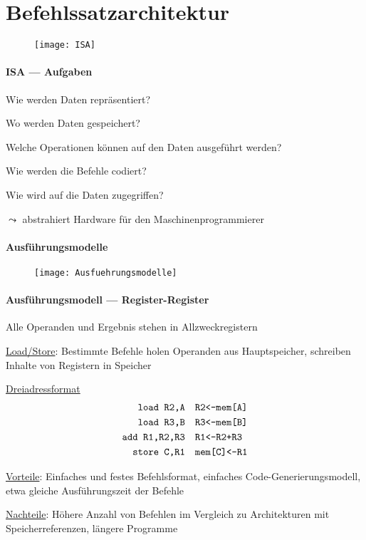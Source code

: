 \section{Befehlssatzarchitektur}
\label{sec:befehlssatzarchitektur}

\begin{figure}[H]
  \centering
  \texttt{[image: ISA]}
  \label{ISA}
\end{figure}

\paragraph{ISA --- Aufgaben}
\begin{items}
	\item Wie werden Daten repräsentiert?
	\item Wo werden Daten gespeichert?
	\item Welche Operationen können auf den Daten ausgeführt werden?
	\item Wie werden die Befehle codiert?
	\item Wie wird auf die Daten zugegriffen?
	\item $\leadsto$ abstrahiert Hardware für den Maschinenprogrammierer
\end{items}

\paragraph{Ausführungsmodelle}
\begin{figure}[H]
  \centering
  \texttt{[image: Ausfuehrungsmodelle]}
  \label{Ausfuehrungsmodelle}
\end{figure}

\paragraph{Ausführungsmodell --- Register-Register}
\begin{items}
	\item Alle Operanden und Ergebnis stehen in Allzweckregistern
	\item \underline{Load/Store}: Bestimmte Befehle holen Operanden aus Hauptspeicher, schreiben Inhalte von Registern in Speicher
	\item \underline{Dreiadressformat}
	\begin{align*}
		\text{\code{load R2,A}} &\quad \text{\code{R2<-mem[A]}} \\
		\text{\code{load R3,B}} &\quad \text{\code{R3<-mem[B]}} \\
		\text{\code{add R1,R2,R3}} &\quad \text{\code{R1<-R2+R3}} \\
		\text{\code{store C,R1}} &\quad \text{\code{mem[C]<-R1}}
	\end{align*}
	\item \underline{Vorteile}: Einfaches und festes Befehlsformat, einfaches Code-Generierungsmodell, etwa gleiche Ausführungszeit der Befehle
	\item \underline{Nachteile}: Höhere Anzahl von Befehlen im Vergleich zu Architekturen mit Speicherreferenzen, längere Programme
\end{items}

